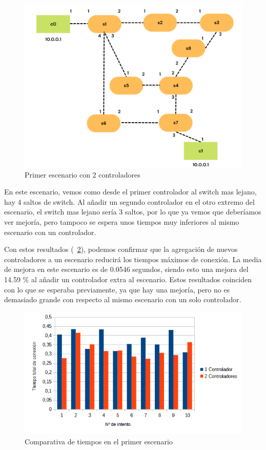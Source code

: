 \documentclass[a4paper, 12pt]{book}
\begin{document}
 	\begin{figure}[H]
 		\centering
 		\includegraphics[width=12cm, keepaspectratio]{img/escenario1-2}
 		\caption{Primer escenario con 2 controladores}
 		\label{figura:escenario1-2c}
 		\vspace{-18pt}
 	\end{figure}
 	
 	En este escenario, vemos como desde el primer controlador al switch mas lejano, hay 4 saltos de switch. Al añadir un segundo controlador en el otro extremo del escenario, el switch mas lejano sería 3 saltos, por lo que ya vemos que deberíamos ver mejoría, pero tampoco se espera unos tiempos muy inferiores al mismo escenario con un controlador.
 	
 	Con estos resultados (~\ref{figura:comparativabucle4}), podemos confirmar que la agregación de nuevos controladores a un escenario reducirá los tiempos máximos de conexión. La media de mejora en este escenario es de 0.0546 segundos, siendo esto una mejora del 14.59 \% al añadir un controlador extra al escenario. 
 	Estos resultados coinciden con lo que se esperaba previamente, ya que hay una mejoría, pero no es demasiado grande con respecto al mismo escenario con un solo controlador.
 	
 	\begin{figure}[H]
 		\centering
 		\includegraphics[width=16cm, keepaspectratio]{img/comparativabucle4}
 		\caption{Comparativa de tiempos en el primer escenario}
 		\label{figura:comparativabucle4}
 	\end{figure}
 	
\end{document}
